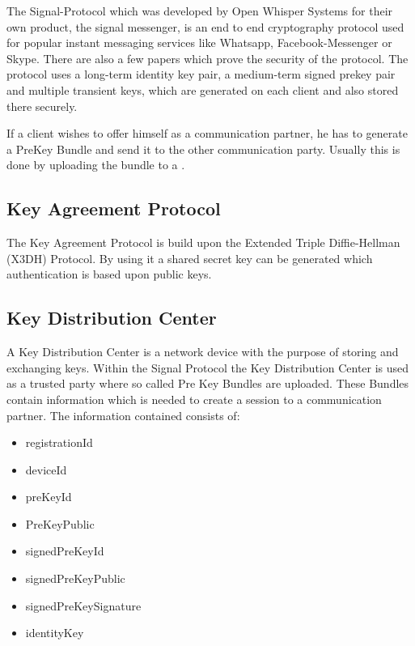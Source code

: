 \documentclass[12pt,twoside,a4paper,parskip]{scrbook}
\begin{document}
The Signal-Protocol which was developed by Open Whisper Systems for their own product, the signal messenger, is an end to end cryptography protocol used for
popular instant messaging services like Whatsapp, Facebook-Messenger or Skype. There are also a few papers which prove the security of the protocol. \parencite{cohn-gordon_formal_2017}
\newline
The protocol uses a long-term identity key pair, a medium-term signed prekey pair and multiple transient keys, which are generated on each client and also stored there
securely.

If a client wishes to offer himself as a communication partner, he has to generate a PreKey Bundle and send it to the other communication party.
Usually this is done by uploading the bundle to a . 

\subsection{Key Agreement Protocol}

The Key Agreement Protocol is build upon the Extended Triple Diffie-Hellman (X3DH) Protocol. By using it a shared secret key can be generated which authentication
is based upon public keys. 


\subsection*{Key Distribution Center}
\label{subsec:KDC}

A Key Distribution Center is a network device with the purpose of storing and exchanging keys. Within the Signal Protocol the Key Distribution Center is used
as a trusted party where so called Pre Key Bundles are uploaded. These Bundles contain information which is needed to create a session to a communication partner.
The information contained consists of:
\begin{itemize}
  \item registrationId
  \item deviceId
  \item preKeyId
  \item PreKeyPublic
  \item signedPreKeyId
  \item signedPreKeyPublic
  \item signedPreKeySignature
  \item identityKey
\end{itemize}
\end{document}
